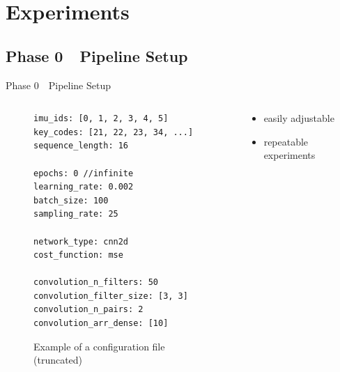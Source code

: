 \section{Experiments}

\subsection{Phase 0~\textendash{}~Pipeline Setup}
\begin{frame}[fragile]{Phase 0~\textendash{}~Pipeline Setup}
    \begin{columns}[T]
        \begin{column}{0.56\textwidth}
            \begin{figure}
                \begin{verbatim}
imu_ids: [0, 1, 2, 3, 4, 5]
key_codes: [21, 22, 23, 34, ...]
sequence_length: 16

epochs: 0 //infinite
learning_rate: 0.002
batch_size: 100
sampling_rate: 25

network_type: cnn2d
cost_function: mse

convolution_n_filters: 50
convolution_filter_size: [3, 3]
convolution_n_pairs: 2
convolution_arr_dense: [10]
                \end{verbatim}
               \label{fig:config}
               \caption{Example of a configuration file (truncated)}
            \end{figure}
        \end{column}
        \begin{column}{0.38\textwidth}
            \begin{itemize}
                \item easily adjustable
                \item repeatable experiments
            \end{itemize}
        \end{column}
    \end{columns}
\end{frame}


